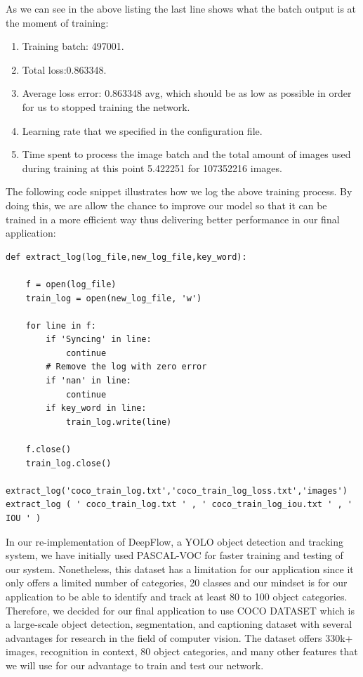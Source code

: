 \vspace{5mm}
As we can see in the above listing the last line shows what the batch output is at the moment of training:
\begin{enumerate}
  \item Training batch: 497001.
  \item Total loss:0.863348.
  \item Average loss error: 0.863348 avg, which should be as low as possible in order for us to stopped training the network.
  \item Learning rate that we specified in the configuration file.
  \item Time spent to process the image batch and the total amount of images used during training at this point 5.422251 for 107352216 images.
\end{enumerate}

\vspace{5mm}
The following code snippet illustrates how we log the above training process. By doing this, we are allow the chance to improve our model so that it can be trained in a more efficient way thus delivering better performance in our final application:

\vspace{5mm}
\begin{lstlisting}
def extract_log(log_file,new_log_file,key_word):

    f = open(log_file)
    train_log = open(new_log_file, 'w')

    for line in f:
        if 'Syncing' in line:
            continue
        # Remove the log with zero error
        if 'nan' in line:
            continue
        if key_word in line:
            train_log.write(line)

    f.close()
    train_log.close()

extract_log('coco_train_log.txt','coco_train_log_loss.txt','images')
extract_log ( ' coco_train_log.txt ' , ' coco_train_log_iou.txt ' , ' IOU ' )
\end{lstlisting}

\vspace{5mm}
In our re-implementation of DeepFlow, a YOLO object detection and tracking system, we have initially used PASCAL-VOC for faster training and testing of our system. Nonetheless, this dataset has a limitation for our application since it only offers a limited number of categories, 20 classes and our mindset is for our application to be able to identify and track at least 80 to 100 object categories. Therefore, we decided for our final application to use COCO DATASET which is a large-scale object detection, segmentation, and captioning dataset with several advantages for research in the field of computer vision. The dataset offers 330k+ images, recognition in context, 80 object categories, and many other features that we will use for our advantage to train and test our network.

